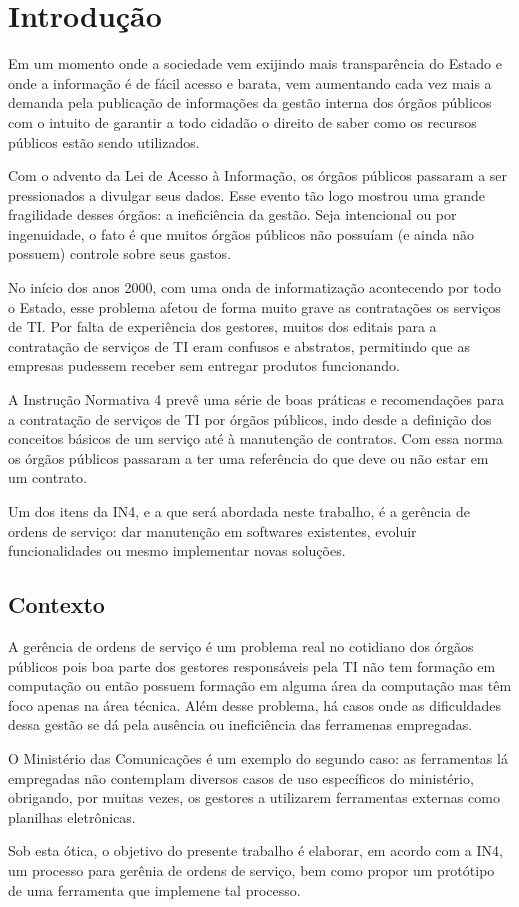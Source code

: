 \section{Introdução}

Em um momento onde a sociedade vem exijindo mais transparência do Estado e onde
a informação é de fácil acesso e barata, vem aumentando cada vez mais a demanda
pela publicação de informações da gestão interna dos órgãos públicos com o
intuito de garantir a todo cidadão o direito de saber como os recursos públicos
estão sendo utilizados.

Com o advento da Lei de Acesso à Informação, os órgãos públicos passaram a ser
pressionados a divulgar seus dados. Esse evento tão logo mostrou uma grande
fragilidade desses órgãos: a ineficiência da gestão. Seja intencional ou por
ingenuidade, o fato é que muitos órgãos públicos não possuíam (e ainda não
possuem) controle sobre seus gastos.

No início dos anos 2000, com uma onda de informatização acontecendo por todo o
Estado, esse problema afetou de forma muito grave as contratações os serviços
de TI. Por falta de experiência dos gestores, muitos dos editais para a
contratação de serviços de TI eram confusos e abstratos, permitindo que as
empresas pudessem receber sem entregar produtos funcionando.

A Instrução Normativa 4 prevê uma série de boas práticas e recomendações para
a contratação de serviços de TI por órgãos públicos, indo desde a definição
dos conceitos básicos de um serviço até à manutenção de contratos. Com essa
norma os órgãos públicos passaram a ter uma referência do que deve ou não estar
em um contrato.

Um dos itens da IN4, e a que será abordada neste trabalho, é a gerência de
ordens de serviço: dar manutenção em softwares existentes, evoluir
funcionalidades ou mesmo implementar novas soluções.

\subsection{Contexto}

A gerência de ordens de serviço é um problema real no cotidiano dos órgãos
públicos pois boa parte dos gestores responsáveis pela TI não tem formação em
computação ou então possuem formação em alguma área da computação mas têm foco
apenas na área técnica. Além desse problema, há casos onde as dificuldades dessa
gestão se dá pela ausência ou ineficiência das ferramenas empregadas.

O Ministério das Comunicações é um exemplo do segundo caso: as ferramentas lá
empregadas não contemplam diversos casos de uso específicos do ministério,
obrigando, por muitas vezes, os gestores a utilizarem ferramentas externas como
planilhas eletrônicas.

Sob esta ótica, o objetivo do presente trabalho é elaborar, em acordo com a IN4,
um processo para gerênia de ordens de serviço, bem como propor um protótipo de
uma ferramenta que implemene tal processo.
